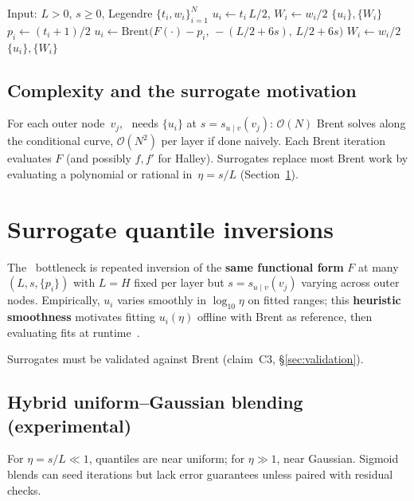 \documentclass[11pt,a4paper]{article}
\begin{document}
\begin{algorithm}[H]
\caption{Brent quantiles for bounded inner marginal}
\label{alg:brent-pill}
\begin{algorithmic}[1]
\STATE Input: $L>0$, $s\ge 0$, Legendre $\{t_i,w_i\}_{i=1}^N$
  \STATE $u_i \gets t_i\,L/2$, $W_i\gets w_i/2$
  \STATE \RETURN $\{u_i\},\{W_i\}$
\ENDIF
{}
  \STATE $p_i \gets (t_i+1)/2$
  \STATE $u_i \gets \mathrm{Brent}\bigl(F(\cdot)-p_i,\,-(L/2+6s),\,L/2+6s\bigr)$
  \STATE $W_i \gets w_i/2$
\ENDFOR
\RETURN $\{u_i\},\{W_i\}$
\end{algorithmic}
\end{algorithm}

\subsection{Complexity and the surrogate motivation}
For each outer node~$v_j$, \profileros\ needs $\{u_i\}$ at $s=s_{u\mid v}(v_j)$: $\mathcal{O}(N)$ Brent solves along the conditional curve, $\mathcal{O}(N^2)$ per layer if done naively.
Each Brent iteration evaluates $F$ (and possibly $f,f'$ for Halley).
Surrogates replace most Brent work by evaluating a polynomial or rational in~$\eta=s/L$ (Section~\ref{sec:surrogates}).

\section{Surrogate quantile inversions}
\label{sec:surrogates}

The \profileros\ bottleneck is repeated inversion of the \textbf{same functional form} $F$ at many $(L,s,\{p_i\})$ with $L=H$ fixed per layer but $s=s_{u\mid v}(v_j)$ varying across outer nodes.
Empirically, $u_i$ varies smoothly in $\log_{10}\eta$ on fitted ranges; this \textbf{heuristic smoothness} motivates fitting $u_i(\eta)$ offline with Brent as reference, then evaluating fits at runtime~\cite{brent1973}.

Surrogates must be validated against Brent (claim~C3, \S\ref{sec:validation}).

\subsection{Hybrid uniform--Gaussian blending (experimental)}
For $\eta=s/L\ll 1$, quantiles are near uniform; for $\eta\gg 1$, near Gaussian.
Sigmoid blends can seed iterations but lack error guarantees unless paired with residual checks.
\end{document}
